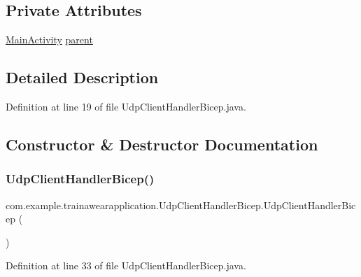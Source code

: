 \subsection*{Private Attributes}
\begin{DoxyCompactItemize}
\item 
\mbox{\hyperlink{classcom_1_1example_1_1trainawearapplication_1_1_main_activity}{Main\+Activity}} \mbox{\hyperlink{classcom_1_1example_1_1trainawearapplication_1_1_udp_client_handler_bicep_a0b203f16a962458064aebb68efbd72bb}{parent}}
\end{DoxyCompactItemize}


\subsection{Detailed Description}


Definition at line 19 of file Udp\+Client\+Handler\+Bicep.\+java.



\subsection{Constructor \& Destructor Documentation}
\mbox{\label{classcom_1_1example_1_1trainawearapplication_1_1_udp_client_handler_bicep_afa5c7cacbf23c1527423e8bf7c22abe1}} 
\subsubsection{\texorpdfstring{UdpClientHandlerBicep()}{UdpClientHandlerBicep()}}
{\footnotesize\ttfamily com.\+example.\+trainawearapplication.\+Udp\+Client\+Handler\+Bicep.\+Udp\+Client\+Handler\+Bicep (\begin{DoxyParamCaption}{ }\end{DoxyParamCaption})}



Definition at line 33 of file Udp\+Client\+Handler\+Bicep.\+java.


\begin{DoxyCode}{0}

\end{DoxyCode}


